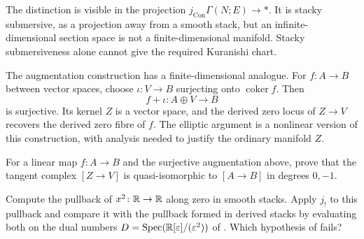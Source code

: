 The distinction is visible in the projection
$j_{\mathrm{Con}}\Gamma(N;E)\to*$.
It is stacky submersive, as a projection away from a smooth stack,
but an infinite-dimensional section space is not a finite-dimensional
manifold. Stacky submersiveness alone cannot give the required
Kuranishi chart.

\begin{example}
The augmentation construction has a finite-dimensional analogue.
For $f\colon A\to B$ between vector spaces, choose $\iota\colon V\to B$
surjecting onto $\operatorname{coker}f$. Then
\[
 f+\iota\colon A\oplus V\longrightarrow B
\]
is surjective. Its kernel $Z$ is a vector space, and the derived
zero locus of $Z\to V$ recovers the derived zero fibre of $f$.
The elliptic argument is a nonlinear version of this construction,
with analysis needed to justify the ordinary manifold $Z$.
\end{example}

\begin{exercise}
For a linear map $f\colon A\to B$ and the surjective augmentation above,
prove that the tangent complex $[Z\to V]$ is quasi-isomorphic to
$[A\to B]$ in degrees $0,-1$.
\end{exercise}

\begin{exercise}
Compute the pullback of $x^2\colon\mathbb{R}\to\mathbb{R}$ along zero in smooth stacks.
Apply $j_!$ to this pullback and compare it with the pullback formed
in derived stacks by evaluating both on the dual numbers
$D=\operatorname{Spec}(\mathbb{R}[\varepsilon]/(\varepsilon^2))$ of
. Which hypothesis of
 fails?
\end{exercise}
